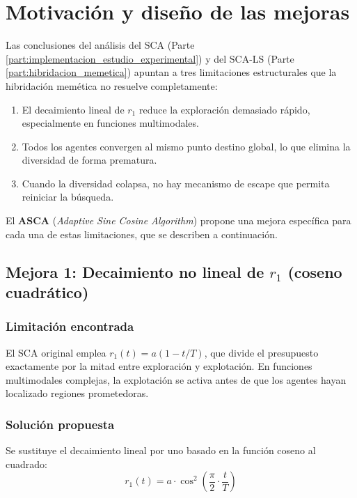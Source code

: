 \documentclass[12pt,a4paper]{article}
\begin{document}
\section{Motivación y diseño de las mejoras}
\label{sec:asca}

Las conclusiones del análisis del SCA (Parte \ref{part:implementacion_estudio_experimental}) y del SCA-LS (Parte \ref{part:hibridacion_memetica}) apuntan a tres limitaciones estructurales que la hibridación memética no resuelve completamente:

\begin{enumerate}
  \item El decaimiento lineal de $r_1$ reduce la exploración demasiado rápido, especialmente en funciones multimodales.
  \item Todos los agentes convergen al mismo punto destino global, lo que elimina la diversidad de forma prematura.
  \item Cuando la diversidad colapsa, no hay mecanismo de escape que permita reiniciar la búsqueda.
\end{enumerate}

El \textbf{ASCA} (\textit{Adaptive Sine Cosine Algorithm}) propone una mejora específica para cada una de estas limitaciones, que se describen a continuación.

\subsection{Mejora 1: Decaimiento no lineal de $r_1$ (coseno cuadrático)}

\subsubsection{Limitación encontrada}

El SCA original emplea $r_1(t) = a(1 - t/T)$, que divide el presupuesto exactamente por la mitad entre exploración y explotación. En funciones multimodales complejas, la explotación se activa antes de que los agentes hayan localizado regiones prometedoras.

\subsubsection{Solución propuesta}

Se sustituye el decaimiento lineal por uno basado en la función coseno al cuadrado:
\begin{equation}
  r_1(t) = a \cdot \cos^2\!\left(\frac{\pi}{2} \cdot \frac{t}{T}\right)
  \label{eq:r1_asca}
\end{equation}
\end{document}
